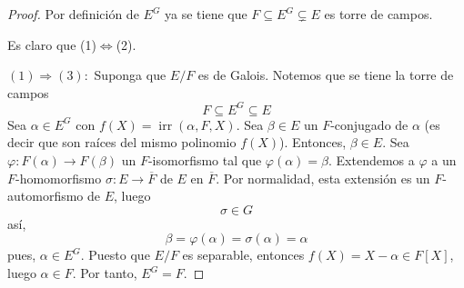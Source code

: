\documentclass[12pt]{report}
\theoremstyle{largebreak}
\newcommand\cf[3]{\ensuremath{#1:#2\rightarrow#3}}
\DeclareMathOperator{\irr}{irr}
\begin{document}
    \begin{proof}
        Por definición de $E^G$ ya se tiene que $F\subseteq E^G\subsetneq E$ es torre de campos.

        Es claro que (1)$\iff$(2).

        $(1)\Rightarrow(3):$ Suponga que $E/F$ es de Galois. Notemos que se tiene la torre de campos
        \begin{equation*}
            F\subseteq E^G\subseteq E
        \end{equation*}
        Sea $\alpha\in E^G$ con $f(X)=\irr(\alpha, F,X)$. Sea $\beta\in E$ un $F$-conjugado de $\alpha$ (es decir que son raíces del mismo polinomio $f(X)$). Entonces, $\beta\in E$. Sea $\cf{\varphi}{F(\alpha)}{F(\beta)}$ un $F$-isomorfismo tal que $\varphi(\alpha)=\beta$. Extendemos a $\varphi$ a un $F$-homomorfismo $\cf{\sigma}{E}{\overline{F}}$ de $E$ en $\overline{F}$. Por normalidad, esta extensión es un $F$-automorfismo de $E$, luego
        \begin{equation*}
            \sigma\in G
        \end{equation*}
        así,
        \begin{equation*}
            \beta=\varphi(\alpha)=\sigma(\alpha)=\alpha
        \end{equation*}
        pues, $\alpha\in E^G$. Puesto que $E/F$ es separable, entonces $f(X)=X-\alpha\in F[X]$, luego $\alpha\in F$. Por tanto, $E^G=F$.


\end{proof}
\end{document}
